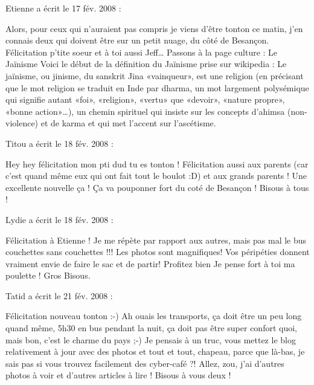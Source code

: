\medskip
Etienne a écrit le 17 fév. 2008 :
\begin{displayquote}
Alors, pour ceux qui n'auraient pas compris je viens d'être tonton ce matin, j'en connais deux qui doivent être sur un petit nuage, du côté de Besançon. Félicitation p'tite soeur et à toi aussi Jeff\dots
Passons à la page culture : Le Jaïnisme
Voici le début de la définition du Jaïnisme prise sur wikipedia : Le jaïnisme, ou jinisme, du sanskrit Jina «vainqueur», est une religion (en précisant que le mot religion se traduit en Inde par dharma, un mot largement polysémique qui signifie autant «foi», «religion», «vertu» que «devoir», «nature propre», «bonne action»\dots), un chemin spirituel qui insiste sur les concepts d'ahimsa (non-violence) et de karma et qui met l'accent sur l'ascétisme.
\end{displayquote}

\medskip
Titou a écrit le 18 fév. 2008 :
\begin{displayquote}
Hey hey félicitation mon pti dud tu es tonton ! Félicitation aussi aux parents (car c'est quand même eux qui ont fait tout le boulot :D) et aux grands parents ! Une excellente nouvelle ça ! Ça va pouponner fort du coté de Besançon ! Bisous à tous !
\end{displayquote}

\medskip
Lydie a écrit le 18 fév. 2008 :
\begin{displayquote}
Félicitation à Etienne !
Je me répète par rapport aux autres, mais pas mal le bus couchettes sans couchettes !!!
Les photos sont magnifiques! Vos péripéties donnent vraiment envie de faire le sac et de partir!
Profitez bien
Je pense fort à toi ma poulette !
Gros Bisous.
\end{displayquote}

\medskip
Tatid a écrit le 21 fév. 2008 :
\begin{displayquote}
Félicitation nouveau tonton :-)
Ah ouais les transports, ça doit être un peu long quand même, 5h30 en bus pendant la nuit, ça doit pas être super confort quoi, mais bon, c'est le charme du pays ;-)
Je pensais à un truc, vous mettez le blog relativement à jour avec des photos et tout et tout, chapeau, parce que là-bas, je sais pas si vous trouvez facilement des cyber-café ?!
Allez, zou, j'ai d'autres photos à voir et d'autres articles à lire !
Bisous à vous deux !
\end{displayquote}

\vfill
